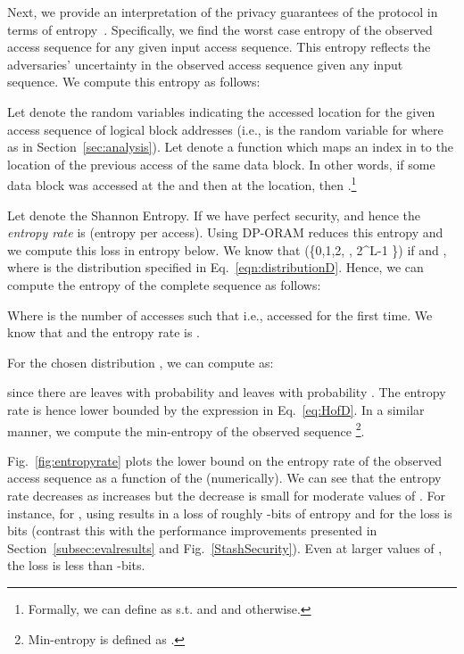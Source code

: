 \documentclass[USenglish,oneside,twocolumn]{article}
\makeatletter
\let\origsection\section
\renewcommand\section{\@ifstar{\starsection}{\nostarsection}}
\newcommand\nostarsection[1]
{\sectionprelude\origsection{#1}\sectionpostlude}
\newcommand\starsection[1]
{\sectionprelude\origsection*{#1}\sectionpostlude}
\newcommand\sectionprelude{\vspace{-1em}
}
\newcommand\sectionpostlude{\vspace{-1em}
}
\makeatother
\begin{document}
\section{Entropy Calculation for DP}\label{appendix:DPdefense}
Next, we provide an interpretation of the privacy guarantees of the protocol in terms of entropy~\cite{paulDP}. Specifically, we find the worst case entropy of the observed access sequence for any given input access sequence. This entropy reflects the adversaries' uncertainty in the observed access sequence given any input sequence. We compute this entropy as follows:


Let  denote the random variables indicating the accessed location for the given access sequence  of logical block addresses (i.e.,  is the random variable for  where  as in Section~\ref{sec:analysis}). Let  denote a function which maps an index in  to the location of the previous access of the same data block. 
In other words, if some data block  was accessed at the   and then at the   location, then .\footnote{Formally, we can define  as  s.t.  and  and  otherwise.

}


Let  denote the Shannon Entropy. If we have perfect security,  and 
hence the \textit{entropy rate} is  (entropy per access). Using DP-ORAM reduces this entropy and we compute this loss in entropy below. We know that (\{0,1,2, \hdots , 2^L-1 \}) if  and , where  is the distribution specified in Eq.~\ref{eqn:distributionD}. Hence, we can compute the entropy of the complete sequence as follows:

Where  is the number of accesses such that  i.e., accessed for the first time. We know that  and the entropy rate is .

For the chosen distribution , we can compute  as:

since there are  leaves with probability  and  leaves with probability . The entropy rate is hence lower bounded by the expression in Eq.~\ref{eq:HofD}. In a similar manner, we compute the min-entropy of the observed sequence \footnote{Min-entropy is defined as .}.







Fig.~\ref{fig:entropyrate} plots the lower bound on the entropy rate of the observed access sequence as a function of the  (numerically). We can see that the entropy rate decreases as  increases but the decrease is small for moderate values of . For instance, for , using  results in a loss of roughly -bits of entropy and for  the loss is  bits (contrast this with the performance improvements presented in Section~\ref{subsec:evalresults} and Fig.~\ref{StashSecurity}). Even at larger values of , the loss is less than -bits.
\end{document}
